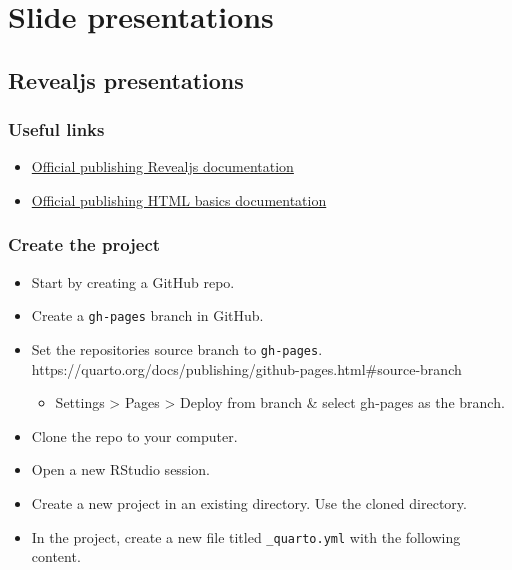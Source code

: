 \documentclass[
  letterpaper,
  DIV=11,
  numbers=noendperiod]{scrreprt}
\providecommand{\tightlist}{%
  \setlength{\itemsep}{0pt}\setlength{\parskip}{0pt}}\usepackage{longtable,booktabs,array}
\begin{document}
\chapter{Slide presentations}\label{sec-slide-presentations}

\section{Revealjs presentations}\label{revealjs-presentations}

\subsection{Useful links}\label{useful-links}

\begin{itemize}
\tightlist
\item
  \href{https://quarto.org/docs/presentations/revealjs/presenting.html\#publishing}{Official
  publishing Revealjs documentation}
\item
  \href{https://quarto.org/docs/publishing/}{Official publishing HTML
  basics documentation}
\end{itemize}

\subsection{Create the project}\label{create-the-project}

\begin{itemize}
\tightlist
\item
  Start by creating a GitHub repo.
\item
  Create a \texttt{gh-pages} branch in GitHub.
\item
  Set the repositories source branch to \texttt{gh-pages}.
  https://quarto.org/docs/publishing/github-pages.html\#source-branch

  \begin{itemize}
  \tightlist
  \item
    Settings \textgreater{} Pages \textgreater{} Deploy from branch \&
    select gh-pages as the branch.
  \end{itemize}
\item
  Clone the repo to your computer.\\
\item
  Open a new RStudio session.
\item
  Create a new project in an existing directory. Use the cloned
  directory.
\item
  In the project, create a new file titled \texttt{\_quarto.yml} with
  the following content.
\end{itemize}
\end{document}
